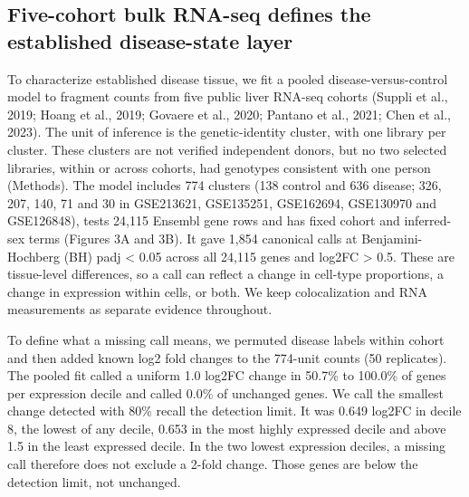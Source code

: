 \subsection{Five-cohort bulk RNA-seq defines the established disease-state layer}\label{five-cohort-bulk-rna-seq-defines-the-established-disease-state-layer}

To characterize established disease tissue, we fit a pooled disease-versus-control model to fragment counts from five public liver RNA-seq cohorts (Suppli et al., 2019; Hoang et al., 2019; Govaere et al., 2020; Pantano et al., 2021; Chen et al., 2023). The unit of inference is the genetic-identity cluster, with one library per cluster. These clusters are not verified independent donors, but no two selected libraries, within or across cohorts, had genotypes consistent with one person (Methods). The model includes 774 clusters (138 control and 636 disease; 326, 207, 140, 71 and 30 in GSE213621, GSE135251, GSE162694, GSE130970 and GSE126848), tests 24,115 Ensembl gene rows and has fixed cohort and inferred-sex terms (Figures 3A and 3B). It gave 1,854 canonical calls at Benjamini-Hochberg (BH) padj \textless{} 0.05 across all 24,115 genes and \textbar log2FC\textbar{} \textgreater{} 0.5. These are tissue-level differences, so a call can reflect a change in cell-type proportions, a change in expression within cells, or both. We keep colocalization and RNA measurements as separate evidence throughout.

To define what a missing call means, we permuted disease labels within cohort and then added known log2 fold changes to the 774-unit counts (50 replicates). The pooled fit called a uniform 1.0 log2FC change in 50.7\% to 100.0\% of genes per expression decile and called 0.0\% of unchanged genes. We call the smallest change detected with 80\% recall the detection limit. It was 0.649 log2FC in decile 8, the lowest of any decile, 0.653 in the most highly expressed decile and above 1.5 in the least expressed decile. In the two lowest expression deciles, a missing call therefore does not exclude a 2-fold change. Those genes are below the detection limit, not unchanged.

